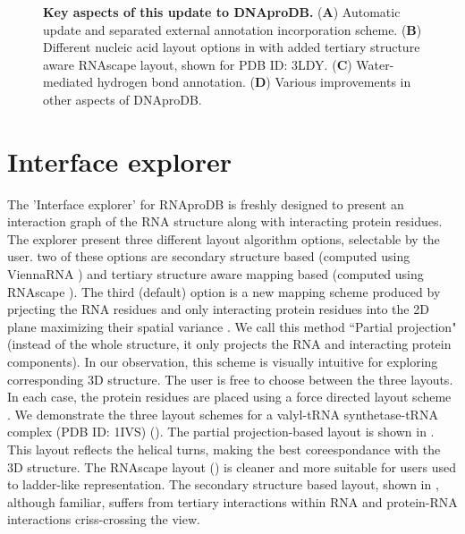 \begin{center}
    \begin{figure}
        \caption[Key aspects of this update to DNAproDB.]{\textbf{Key aspects of this update to DNAproDB.} ({\bf A}) Automatic update and separated external annotation incorporation scheme.  ({\bf B})  Different nucleic acid layout options in with added tertiary structure aware RNAscape layout, shown for PDB ID: 3LDY. ({\bf C}) Water-mediated hydrogen bond annotation. ({\bf D}) Various improvements in other aspects of DNAproDB. }
  \label{fig:rnaprodb1}
\end{figure}
\end{center}

\section{Interface explorer}

The 'Interface explorer' for RNAproDB is freshly designed to present an interaction graph of the RNA structure along with interacting protein residues. The explorer present three different layout algorithm options, selectable by the user. two of these options are secondary structure based (computed using ViennaRNA \citep{Lorenz2011}) and tertiary structure aware mapping based (computed using RNAscape \citep{Mitra2024rnascape}). The third (default) option is a new mapping scheme produced by prjecting the RNA residues and only interacting protein residues into the 2D plane maximizing their spatial variance \citep{Pearson1901}. We call this method ``Partial projection" (instead of the whole structure, it only projects the RNA and interacting protein components). In our observation, this scheme is visually intuitive for exploring corresponding 3D structure. The user is free to choose between the three layouts. In each case, the protein residues are placed using a force directed layout scheme \citep{bostock2012fl}. We demonstrate the three layout schemes for a valyl-tRNA synthetase-tRNA complex (PDB ID: 1IVS) (). The partial projection-based layout is shown in . This layout reflects the helical turns, making the best coreespondance with the 3D structure. The RNAscape \citep{Mitra2024rnascape} layout () is cleaner and more suitable for users used to ladder-like representation.  The secondary structure based layout, shown in , although familiar, suffers from tertiary interactions within RNA and protein-RNA interactions criss-crossing the view. 

